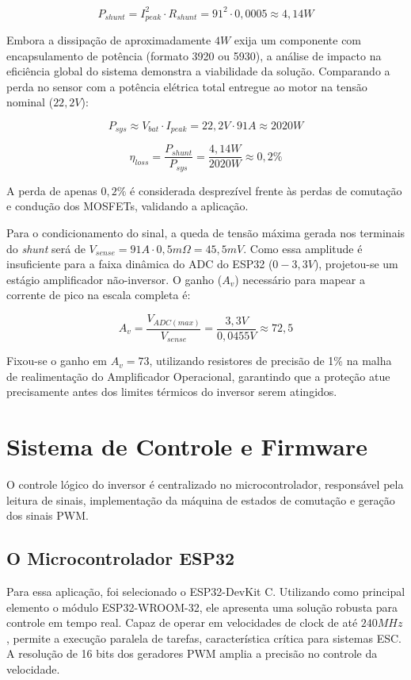 \documentclass[12pt, a4paper, openright, oneside, brazilian]{abntex2}
\begin{document}
\begin{equation}
    P_{shunt} = I_{peak}^2 \cdot R_{shunt} = 91^2 \cdot 0,0005 \approx 4,14 W
\end{equation}

Embora a dissipação de aproximadamente $4W$ exija um componente com encapsulamento de potência (formato 3920 ou 5930), a análise de impacto na eficiência global do sistema demonstra a viabilidade da solução. Comparando a perda no sensor com a potência elétrica total entregue ao motor na tensão nominal ($22,2V$):

\begin{equation}
    P_{sys} \approx V_{bat} \cdot I_{peak} = 22,2V \cdot 91A \approx 2020 W
\end{equation}

\begin{equation}
    \eta_{loss} = \frac{P_{shunt}}{P_{sys}} = \frac{4,14W}{2020W} \approx 0,2\%
\end{equation}

A perda de apenas $0,2\%$ é considerada desprezível frente às perdas de comutação e condução dos MOSFETs, validando a aplicação.

Para o condicionamento do sinal, a queda de tensão máxima gerada nos terminais do \textit{shunt} será de $V_{sense} = 91A \cdot 0,5m\Omega = 45,5mV$. Como essa amplitude é insuficiente para a faixa dinâmica do ADC do ESP32 ($0-3,3V$), projetou-se um estágio amplificador não-inversor. O ganho ($A_v$) necessário para mapear a corrente de pico na escala completa é:

\begin{equation}
    A_v = \frac{V_{ADC(max)}}{V_{sense}} = \frac{3,3V}{0,0455V} \approx 72,5
\end{equation}

Fixou-se o ganho em $A_v = 73$, utilizando resistores de precisão de 1\% na malha de realimentação do Amplificador Operacional, garantindo que a proteção atue precisamente antes dos limites térmicos do inversor serem atingidos.

\section{Sistema de Controle e Firmware}
O controle lógico do inversor é centralizado no microcontrolador, responsável pela leitura de sinais, implementação da máquina de estados de comutação e geração dos sinais PWM.

\subsection{O Microcontrolador ESP32}
Para essa aplicação, foi selecionado o ESP32-DevKit C. Utilizando como principal elemento o módulo ESP32-WROOM-32, ele apresenta uma solução robusta para controle em tempo real. Capaz de operar em velocidades de clock de até $240 MHz$, permite a execução paralela de tarefas, característica crítica para sistemas ESC. A resolução de 16 bits dos geradores PWM amplia a precisão no controle da velocidade.
\end{document}
